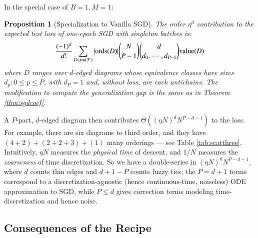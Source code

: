 \documentclass{article}
\newtheorem{prop}{Proposition}
\newcommand{\Free}{\mathcal{F}}
\newcommand{\image}{\text{\textnormal{im}}}
\newcommand{\dvalue}{\text{\textnormal{value}}}
\newcommand{\ords}{\text{\textnormal{ords}}}
\begin{document}
        In the special case of $B=1, M=1$:
        \begin{prop}[Specialization to Vanilla SGD] \label{prop:vanilla}
            The order $\eta^d$ contribution to the expected test loss of
            one-epoch SGD with singleton batches is:
            \begin{equation}\label{eq:sgdbasiccoef}
                \frac{(-1)^d}{d!} \sum_{D\in \image(\Free)} 
                |\ords(D)| {N \choose P-1} {d \choose d_0,\cdots,d_{P-1}}
                \dvalue(D)
            \end{equation}
            where $D$ ranges over $d$-edged diagrams whose equivalence classes
            have sizes $d_p: 0\leq p\leq P$, with $d_P=1$
            and, without loss, are each antichains.  The modification to
            compute the generalization gap is the same as in Theorem
            \ref{thm:sgdcoef}.
        \end{prop}
        A $P$-part, $d$-edged diagram then contributes $\Theta\left((\eta N)^d
        N^{P-d-1}\right)$ to the loss.  For example, there are six diagrams to
        third order, and they have $(4+2)+(2+2+3)+(1)$ many orderings --- see
        Table \ref{tab:scatthree}.  Intuitively, $\eta N$ measures the \emph{
            physical time} of descent, and $1/N$ measures the \emph{coarseness}
        of time discretization.  So we have a double-series in $(\eta N)^d
        N^{P-d-1}$, where $d$ counts thin edges and $d+1-P$ counts fuzzy ties;
        the $P=d+1$ terms correspond to a discretization-agnostic (hence
        continuous-time, noiseless) ODE approximation to SGD, while $P\leq d$
        gives correction terms modeling time-discretization and hence noise.  


    \subsection{Consequences of the Recipe}
\end{document}
